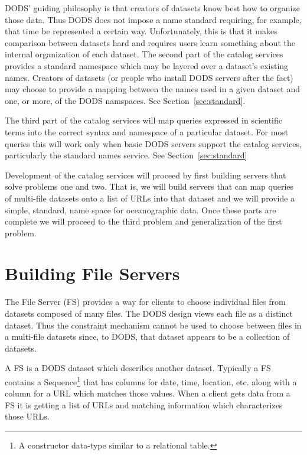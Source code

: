 \documentclass[12pt]{article}
\begin{document}

DODS' guiding philosophy is that creators of datasets know best how to
organize those data. Thus DODS does not impose a name standard requiring, for
example, that time be represented a certain way. Unfortunately, this is that
it makes comparison between datasets hard and requires users learn something
about the internal organization of each dataset. The second part of the
catalog services provides a standard namespace which may be layered over a
dataset's existing names. Creators of datasets (or people who install DODS
servers after the fact) may choose to provide a mapping between the names
used in a given dataset and one, or more, of the DODS namspaces. See
Section~\ref{sec:standard}.


The third part of the catalog services will map queries expressed in
scientific terms into the correct syntax and namespace of a particular
dataset. For most queries this will work only when basic DODS servers support
the catalog services, particularly the standard names service. See Section~\ref{sec:standard}

Development of the catalog services will proceed by first building servers
that solve problems one and two. That is, we will build servers that can map
queries of multi-file datasets onto a list of URLs into that dataset and we
will provide a simple, standard, name space for oceanographic data. Once
these parts are complete we will proceed to the third problem and
generalization of the first problem.

\section{Building File Servers}
\label{sec:fileserver}

The File Server (FS) provides a way for clients to choose individual files
from datasets composed of many files. The DODS design views each file as a
distinct dataset. Thus the constraint mechanism cannot be used to choose
between files in a multi-file datasets since, to DODS, that dataset appears to
be a collection of datasets. 

A FS is a DODS dataset which describes another dataset. Typically a FS
contains a Sequence\footnote{A constructor data-type similar to a relational
  table.} that has columns for date, time, location, etc. along with a column
for a URL which matches those values. When a client gets data from a FS it is
getting a list of URLs and matching information which characterizes those
URLs.
\end{document}
